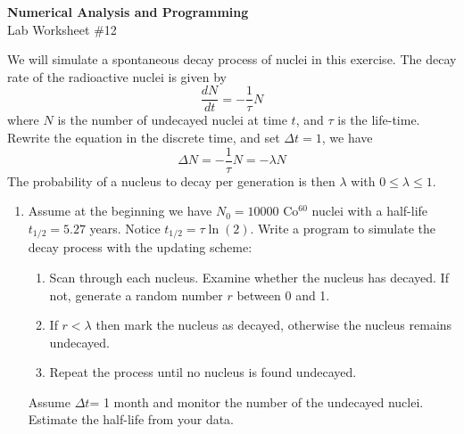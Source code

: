 \documentclass[12pt]{article}
\begin{document}
\begin{center}
\Large
\textbf{Numerical Analysis and Programming}\\
\large
Lab Worksheet \#12
\end{center}
 We will simulate a spontaneous decay process of nuclei in this exercise. The decay rate of the radioactive nuclei is given by
\[
\frac{dN}{dt}=-\frac{1}{\tau} N
\]
where $N$ is the number of undecayed nuclei at time $t$, and $\tau$ is the life-time.
Rewrite the equation in the discrete time, and set $\Delta t=1$, we have
\[
\Delta N = -\frac{1}{\tau} N =-\lambda N
\]
The probability of a nucleus to decay per generation is then $\lambda$ with $0\le \lambda\le 1$.
\begin{enumerate}
\item Assume at the beginning we have $N_0=10000$ Co$^{60}$ nuclei with a half-life $t_{1/2}=  5.27$ years. Notice $t_{1/2}=\tau \ln(2)$. Write a program to simulate
the decay process with the updating scheme:
\begin{enumerate}
\item Scan through each nucleus. Examine whether the nucleus has decayed. If not, generate a random number $r$ between 0 and 1.
\item If $r < \lambda $ then mark the nucleus as decayed, otherwise the nucleus remains undecayed.
\item Repeat the process until no nucleus is found undecayed.
\end{enumerate}
Assume $\Delta t $= 1 month and monitor the number of the undecayed  nuclei. Estimate the half-life from your data.
\end{enumerate}
\end{document}
